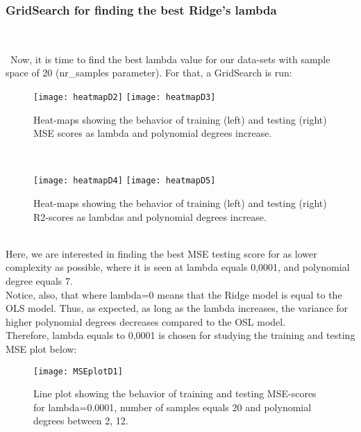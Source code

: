 \subsubsection{GridSearch for finding the best Ridge's lambda} \\
\label{chap:GridSearch for finding the best Ridge's lambda}

\quad \, Now, it is time to find the best lambda value for our data-sets with sample space of 20 (nr\_samples parameter). For that, a GridSearch is run: \\

\begin{figure}[H]
\label{fig:heatmapD2andD3}
\texttt{[image: heatmapD2]}
\texttt{[image: heatmapD3]}
\caption{Heat-maps showing the behavior of training (left) and testing (right) MSE scores as lambda and polynomial degrees increase.}
\centering
\end{figure}\\

\begin{figure}[H]
\label{fig:heatmapD4andD5}
\texttt{[image: heatmapD4]}
\texttt{[image: heatmapD5]}
\caption{Heat-maps showing the behavior of training (left) and testing (right) R2-scores as lambdas and polynomial degrees increase.}
\centering
\end{figure}\\

Here, we are interested in finding the best MSE testing score for as lower complexity as possible, where it is seen at lambda equals 0,0001, and polynomial degree equals 7. \\

Notice, also, that where lambda=0 means that the Ridge model is equal to the OLS model. Thus, as expected, as long as the lambda increases, the variance for higher polynomial degrees decreases compared to the OSL model. \\

Therefore, lambda equals to 0,0001 is chosen for studying the training and testing MSE plot below: \\

\begin{figure}[H]
\label{fig:MSEplotD1}
\centering
\texttt{[image: MSEplotD1]}
\caption{Line plot showing the behavior of training and testing MSE-scores for lambda=0.0001, number of samples equals 20 and polynomial degrees between 2, 12.}
\end{figure}\\


